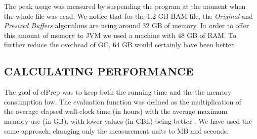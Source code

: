 \documentclass[a4paper,twoside]{article}
\begin{document}
The peak usage was measured by suspending the program at the moment when the whole file was read.
We notice that for the $1.2$ GB BAM file, the {\textit{Original} } and {\textit{Presized Buffers} } algorithms are using around $32$ GB of memory. In order to offer this amount of memory to JVM we used a machine with $48$ GB of RAM. To further reduce the overhead of GC, $64$ GB would certainly have been better.




 
 
\subsection{\uppercase{Calculating Performance}}
\label{subsec:performance}
The goal of elPrep was to keep both the running time and the the memory consumption low. The evaluation function was defined as the multiplication of the average elapsed wall-clock time (in hours) with the average maximum memory use (in GB), with lower values (in GBh) being better \cite{costanza:2019}.
We have used the same approach, changing only the measurement units to MB and seconds.




%
%
\end{document}

